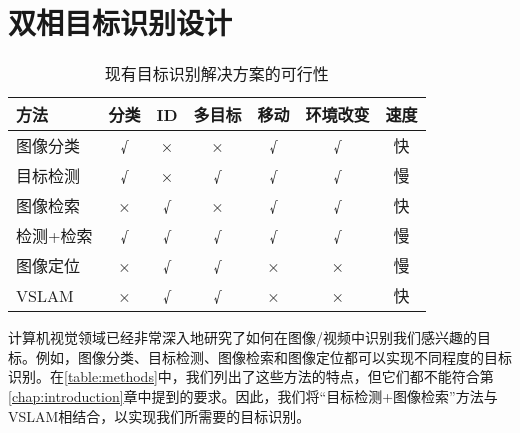 \section{双相目标识别设计}
\label{sec:twophase}
\begin{table}[htbp]
	  \centering
	  \caption{\label{table:methods}现有目标识别解决方案的可行性}
	  \begin{tabular}{|l|c|c|c|c|c|c|}\hline
	  方法 &
		分类 &
		ID &
		多目标 &
		移动 &
		环境改变 &
		速度 \\
		\hline 图像分类\cite{he2019bag} &
		{\color[HTML]{355421} √} &
		{\color[HTML]{BF0000} ×} &
		{\color[HTML]{BF0000} ×} &
		{\color[HTML]{355421} √} &
		{\color[HTML]{355421} √} &
		{\color[HTML]{355421} 快} \\ \hline
	  目标检测\cite{zou2019object} &
		{\color[HTML]{355421} √} &
		{\color[HTML]{BF0000} ×} &
		{\color[HTML]{355421} √} &
		{\color[HTML]{355421} √} &
		{\color[HTML]{355421} √} &
		{\color[HTML]{BF0000} 慢} \\ \hline
	  图像检索\cite{philbin2008lost,zheng2017sift} &
		{\color[HTML]{BF0000} ×} &
		{\color[HTML]{355421} √} &
		{\color[HTML]{BF0000} ×} &
		{\color[HTML]{355421} √} &
		{\color[HTML]{355421} √} &
		{\color[HTML]{355421} 快} \\ \hline
	  检测+检索 &
		{\color[HTML]{355421} √} &
		{\color[HTML]{355421} √} &
		{\color[HTML]{355421} √} &
		{\color[HTML]{355421} √} &
		{\color[HTML]{355421} √} &
		{\color[HTML]{BF0000} 慢} \\ \hline
	  图像定位\cite{sattler2011fast} &
		{\color[HTML]{BF0000} ×} &
		{\color[HTML]{355421} √} &
		{\color[HTML]{355421} √} &
		{\color[HTML]{BF0000} ×} &
		{\color[HTML]{BF0000} ×} &
		{\color[HTML]{BF0000} 慢} \\ \hline
	  VSLAM\cite{liu2021edgesharing} &
		{\color[HTML]{BF0000} ×} &
		{\color[HTML]{355421} √} &
		{\color[HTML]{355421} √} &
		{\color[HTML]{BF0000} ×} &
		{\color[HTML]{BF0000} ×} &
		{\color[HTML]{355421} 快} \\ \hline
	  \end{tabular}
	\end{table}
  
  计算机视觉领域已经非常深入地研究了如何在图像/视频中识别我们感兴趣的目标。例如，图像分类\cite{he2019bag}、目标检测\cite{zou2019object}、图像检索\cite{philbin2008lost,zheng2017sift}和图像定位\cite{sattler2011fast}都可以实现不同程度的目标识别。在\autoref{table:methods}中，我们列出了这些方法的特点，但它们都不能符合第\ref{chap:introduction}章中提到的要求。因此，我们将“目标检测+图像检索”方法与VSLAM相结合，以实现我们所需要的目标识别。
  
